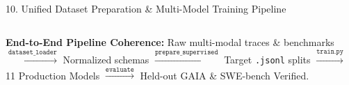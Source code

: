 \documentclass[aspectratio=169,10pt]{beamer}
\begin{document}
\begin{frame}[t]{10. Unified Dataset Preparation \& Multi-Model Training Pipeline}
\begin{columns}[T]
\end{columns}

\vspace{0.10em}
\begin{tcolorbox}[
  enhanced, arc=2.5pt, colframe=lavenderDark!70, colback=lavenderLight!35, boxrule=0.55pt,
  left=3.5pt, right=3.5pt, top=1.5pt, bottom=1.5pt
]
\centering\fontsize{4.8}{5.8}\selectfont\color{lavenderDark}
\textbf{End-to-End Pipeline Coherence:} Raw multi-modal traces \& benchmarks $\xrightarrow{\texttt{dataset\_loader}}$ Normalized schemas $\xrightarrow{\texttt{prepare\_supervised}}$ Target \texttt{.jsonl} splits $\xrightarrow{\texttt{train.py}}$ 11 Production Models $\xrightarrow{\texttt{evaluate}}$ Held-out GAIA \& SWE-bench Verified.
\end{tcolorbox}
\end{frame}
\end{document}
